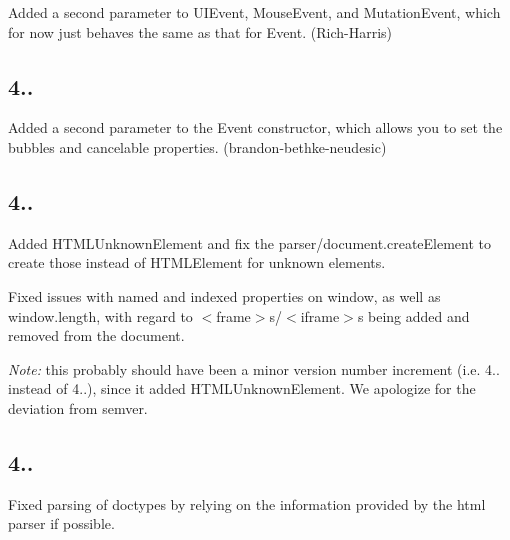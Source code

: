 \begin{DoxyItemize}
\item Added a second parameter to {\ttfamily U\+I\+Event}, {\ttfamily Mouse\+Event}, and {\ttfamily Mutation\+Event}, which for now just behaves the same as that for {\ttfamily Event}. (Rich-\/\+Harris)
\end{DoxyItemize}

\subsection*{4..}


\begin{DoxyItemize}
\item Added a second parameter to the {\ttfamily Event} constructor, which allows you to set the {\ttfamily bubbles} and {\ttfamily cancelable} properties. (brandon-\/bethke-\/neudesic)
\end{DoxyItemize}

\subsection*{4..}


\begin{DoxyItemize}
\item Added {\ttfamily H\+T\+M\+L\+Unknown\+Element} and fix the parser/{\ttfamily document.\+create\+Element} to create those instead of {\ttfamily H\+T\+M\+L\+Element} for unknown elements.
\item Fixed issues with named and indexed properties on {\ttfamily window}, as well as {\ttfamily window.\+length}, with regard to {\ttfamily $<$frame$>$}s/{\ttfamily $<$iframe$>$}s being added and removed from the document.
\end{DoxyItemize}

{\itshape Note\+:} this probably should have been a minor version number increment (i.\+e. 4.. instead of 4..), since it added {\ttfamily H\+T\+M\+L\+Unknown\+Element}. We apologize for the deviation from semver.

\subsection*{4..}


\begin{DoxyItemize}
\item Fixed parsing of doctypes by relying on the information provided by the html parser if possible.
\end{DoxyItemize}


